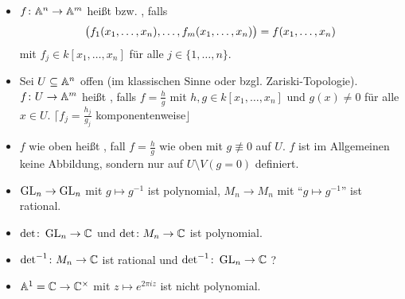 \begin{defn}
	\begin{itemize}
		\item $f \colon \aff^n \rightarrow \aff^m$ heißt  bzw. , falls
		\[ \enbrace[\big]{f_1(x_1,\dots,x_n),\dots,f_m(x_1,\dots,x_n)} = f(x_1,\dots,x_n) \]
		mit $f_j \in k[x_1,\dots,x_n]$ für alle $j \in \{1,\dots,n\}$.   
		\item Sei $U \subseteq \aff^n$ offen (im klassischen Sinne oder bzgl. Zariski-Topologie). $f\colon U \rightarrow \aff^m$ heißt , falls 
		$f = \frac{h}{g}$ mit $h,g \in k[x_1,\dots,x_n]$ und $g(x) \neq 0$ für alle $x \in U$. \hfill $\lceil f_j = \frac{h_j}{g_j}$ komponentenweise$\rfloor$
		\item $f$ wie oben heißt , fall $f = \frac{h}{g}$ wie oben mit $g \not\equiv 0$ auf $U$. $f$ ist im Allgemeinen keine Abbildung, sondern nur 
		auf $U \setminus V(g = 0)$ definiert. 
	\end{itemize}
\end{defn}

\begin{bsp}
	\begin{itemize}
		\item $\GL_n \rightarrow \GL_n$ mit $g \mapsto g^{-1}$ ist polynomial, $M_n \rightarrow M_n$ mit \enquote{$g \mapsto g^{-1}$} ist rational.
		\item $\det\colon \GL_n \rightarrow \CC$ und $\det\colon M_n \rightarrow \CC$ ist polynomial.
		\item $\det^{-1}\colon M_n \rightarrow \CC$ ist rational und  $\det^{-1}\colon \GL_n \rightarrow \CC$ ?
		\item $\aff^1 = \CC \rightarrow \CC^\times$ mit $z \mapsto e^{2\pi i z}$ ist nicht polynomial.
	\end{itemize}
\end{bsp}
\newpage